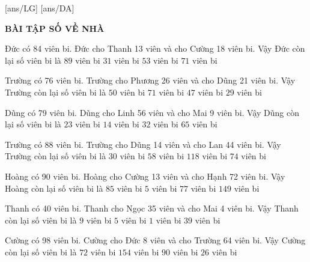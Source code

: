 \documentclass[12pt,a4paper]{article}
\begin{document}
[ans/LG]
[ans/DA]
\pagestyle{fancy}
\fancyhf{}
\begin{center}
{\bf\Large BÀI TẬP SỐ VỀ NHÀ}
\end{center}
\begin{ex}
Đức có 84 viên bi. Đức cho Thanh 13 viên và cho Cường 18 viên bi. Vậy Đức còn lại số viên bi là
 \choice 
{$89$ viên bi}
{$31$ viên bi}
{\True $53$ viên bi}
{$71$ viên bi}
\end{ex}
\begin{ex}
Trường có 76 viên bi. Trường cho Phương 26 viên và cho Dũng 21 viên bi. Vậy Trường còn lại số viên bi là
 \choice 
{$50$ viên bi}
{$71$ viên bi}
{$47$ viên bi}
{\True $29$ viên bi}
\end{ex}
\begin{ex}
Dũng có 79 viên bi. Dũng cho Linh 56 viên và cho Mai 9 viên bi. Vậy Dũng còn lại số viên bi là
 \choice 
{$23$ viên bi}
{\True $14$ viên bi}
{$32$ viên bi}
{$65$ viên bi}
\end{ex}
\begin{ex}
Trường có 88 viên bi. Trường cho Dũng 14 viên và cho Lan 44 viên bi. Vậy Trường còn lại số viên bi là
 \choice 
{\True $30$ viên bi}
{$58$ viên bi}
{$118$ viên bi}
{$74$ viên bi}
\end{ex}
\begin{ex}
Hoàng có 90 viên bi. Hoàng cho Cường 13 viên và cho Hạnh 72 viên bi. Vậy Hoàng còn lại số viên bi là
 \choice 
{$85$ viên bi}
{\True $5$ viên bi}
{$77$ viên bi}
{$149$ viên bi}
\end{ex}
\begin{ex}
Thanh có 40 viên bi. Thanh cho Ngọc 35 viên và cho Mai 4 viên bi. Vậy Thanh còn lại số viên bi là
 \choice 
{$9$ viên bi}
{$5$ viên bi}
{\True $1$ viên bi}
{$39$ viên bi}
\end{ex}
\begin{ex}
Cường có 98 viên bi. Cường cho Đức 8 viên và cho Trường 64 viên bi. Vậy Cường còn lại số viên bi là
 \choice 
{$72$ viên bi}
{$154$ viên bi}
{$90$ viên bi}
{\True $26$ viên bi}
\end{ex}
\end{document}
